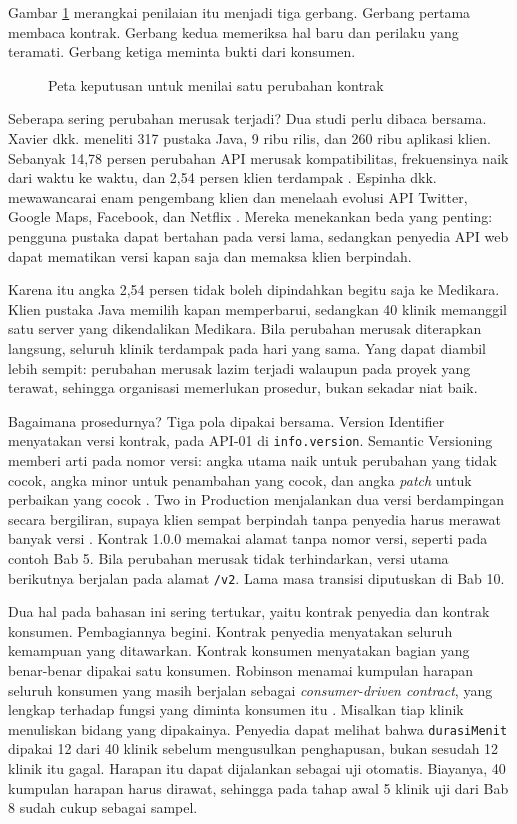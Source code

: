 Gambar \ref{fig:ch09-keputusan} merangkai penilaian itu menjadi tiga gerbang. Gerbang pertama membaca kontrak. Gerbang kedua memeriksa hal baru dan perilaku yang teramati. Gerbang ketiga
meminta bukti dari konsumen.

\begin{figure}[!htb]
  \centering
  
  \caption{Peta keputusan untuk menilai satu perubahan kontrak}
  \label{fig:ch09-keputusan}
\end{figure}

Seberapa sering perubahan merusak terjadi? Dua studi perlu dibaca bersama. Xavier dkk. meneliti 317 pustaka Java, 9 ribu rilis, dan 260 ribu aplikasi klien. Sebanyak 14,78 persen perubahan API
merusak kompatibilitas, frekuensinya naik dari waktu ke waktu, dan 2,54 persen klien terdampak \cite{c09-xavier2017}. Espinha dkk. mewawancarai enam pengembang klien dan menelaah evolusi API Twitter,
Google Maps, Facebook, dan Netflix \cite{espinha2014}. Mereka menekankan beda yang penting: pengguna pustaka dapat bertahan pada versi lama, sedangkan penyedia API web dapat mematikan versi
kapan saja dan memaksa klien berpindah.

Karena itu angka 2,54 persen tidak boleh dipindahkan begitu saja ke Medikara. Klien pustaka Java memilih kapan memperbarui, sedangkan 40 klinik memanggil satu server yang dikendalikan Medikara. Bila
perubahan merusak diterapkan langsung, seluruh klinik terdampak pada hari yang sama. Yang dapat diambil lebih sempit: perubahan merusak lazim terjadi walaupun pada proyek yang terawat, sehingga
organisasi memerlukan prosedur, bukan sekadar niat baik.

Bagaimana prosedurnya? Tiga pola dipakai bersama. Version Identifier menyatakan versi kontrak, pada API-01 di \texttt{info.version}. Semantic Versioning memberi arti pada nomor versi: angka utama naik
untuk perubahan yang tidak cocok, angka minor untuk penambahan yang cocok, dan angka \textit{patch} untuk perbaikan yang cocok \cite{c09-semver}. Two in Production menjalankan dua versi berdampingan
secara bergiliran, supaya klien sempat berpindah tanpa penyedia harus merawat banyak versi \cite{zimmermann2022patterns}. Kontrak 1.0.0 memakai alamat tanpa nomor versi, seperti pada contoh Bab 5. Bila
perubahan merusak tidak terhindarkan, versi utama berikutnya berjalan pada alamat \texttt{/v2}. Lama masa transisi diputuskan di Bab 10.

Dua hal pada bahasan ini sering tertukar, yaitu kontrak penyedia dan kontrak konsumen. Pembagiannya begini. Kontrak penyedia menyatakan seluruh kemampuan yang ditawarkan. Kontrak konsumen menyatakan bagian
yang benar-benar dipakai satu konsumen. Robinson menamai kumpulan harapan seluruh konsumen yang masih berjalan sebagai \textit{consumer-driven contract}, yang lengkap terhadap fungsi yang diminta konsumen itu
\cite{c09-robinson2006}. Misalkan tiap klinik menuliskan bidang yang dipakainya. Penyedia dapat melihat bahwa \texttt{durasiMenit} dipakai 12 dari 40 klinik sebelum mengusulkan penghapusan, bukan sesudah 12 klinik
itu gagal. Harapan itu dapat dijalankan sebagai uji otomatis. Biayanya, 40 kumpulan harapan harus dirawat, sehingga pada tahap awal 5 klinik uji dari Bab 8 sudah cukup sebagai sampel.


